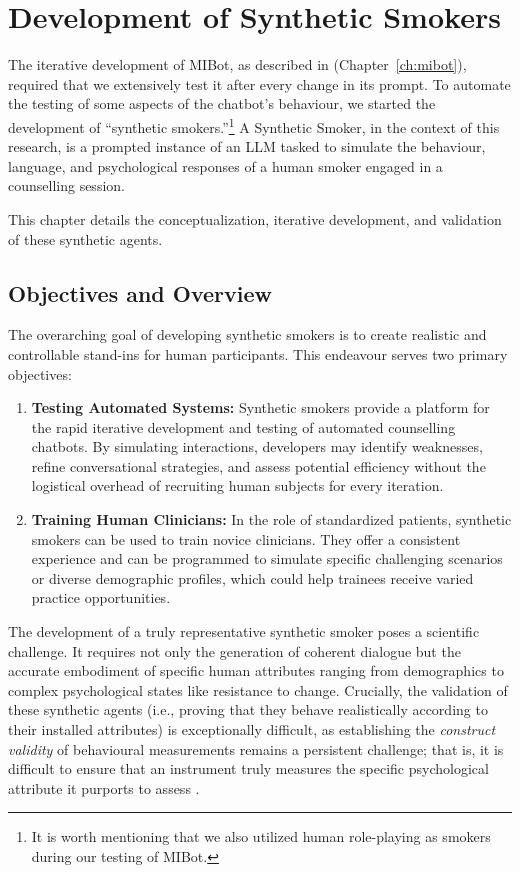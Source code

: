 \chapter{Development of Synthetic Smokers}
\label{ch:synthetic-smoker}

The iterative development of MIBot, as described in (Chapter~\ref{ch:mibot}), required that we extensively test it after every change in its prompt. To automate the testing of some aspects of the chatbot's behaviour, we started the development of ``synthetic smokers.''\footnote{It is worth mentioning that we also utilized human role-playing as smokers during our testing of MIBot.} A Synthetic Smoker, in the context of this research, is a prompted instance of an LLM tasked to simulate the behaviour, language, and psychological responses of a human smoker engaged in a counselling session.

This chapter details the conceptualization, iterative development, and validation of these synthetic agents.

\section{Objectives and Overview}
\label{sec:synthetic-smoker-goals}

The overarching goal of developing synthetic smokers is to create realistic and controllable stand-ins for human participants. This endeavour serves two primary objectives:

\begin{enumerate}
    \item \textbf{Testing Automated Systems:} Synthetic smokers provide a platform for the rapid iterative development and testing of automated counselling chatbots. By simulating interactions, developers may identify weaknesses, refine conversational strategies, and assess potential efficiency without the logistical overhead of recruiting human subjects for every iteration.
    \item \textbf{Training Human Clinicians:} In the role of standardized patients, synthetic smokers can be used to train novice clinicians. They offer a consistent experience and can be programmed to simulate specific challenging scenarios or diverse demographic profiles, which could help trainees receive varied practice opportunities.
\end{enumerate}

The development of a truly representative synthetic smoker poses a scientific challenge. It requires not only the generation of coherent dialogue but the accurate embodiment of specific human attributes ranging from demographics to complex psychological states like resistance to change. Crucially, the validation of these synthetic agents (i.e., proving that they behave realistically according to their installed attributes) is exceptionally difficult, as establishing the \textit{construct validity} of behavioural measurements remains a persistent challenge; that is, it is difficult to ensure that an instrument truly measures the specific psychological attribute it purports to assess \cite{Cronbach1955}.


